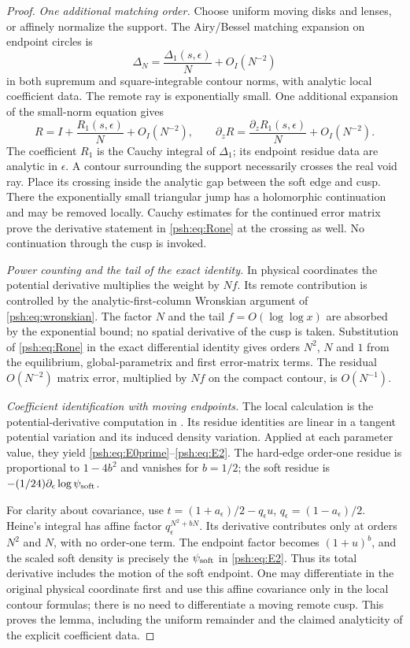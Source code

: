 \documentclass[11pt,a4paper]{article}
\numberwithin{equation}{section}
\theoremstyle{remark}\newtheorem{remark}[theorem]{Remark}
\begin{document}
\begin{proof}
\textit{One additional matching order.}
Choose uniform moving disks and lenses, or affinely normalize the
support. The Airy/Bessel matching expansion on endpoint circles is
\[
 \Delta_N=\frac{\Delta_1(s,\epsilon)}N+O_I(N^{-2})
\]
in both supremum and square-integrable contour norms, with analytic
local coefficient data. The remote ray is exponentially small.
One additional expansion of the small-norm equation gives
\begin{equation}\label{psh:eq:Rone}
 R=I+\frac{R_1(s,\epsilon)}N+O_I(N^{-2}),\qquad
 \partial_zR=\frac{\partial_zR_1(s,\epsilon)}N+O_I(N^{-2}).
\end{equation}
The coefficient $R_1$ is the Cauchy integral of $\Delta_1$; its endpoint
residue data are analytic in $\epsilon$.
A contour surrounding the support necessarily crosses the real void
ray. Place its crossing inside the analytic gap between the soft edge
and cusp. There the exponentially small triangular jump has a
holomorphic continuation and may be removed locally. Cauchy estimates
for the continued error matrix prove the derivative statement in
\eqref{psh:eq:Rone} at the crossing as well. No continuation through the
cusp is invoked.

\textit{Power counting and the tail of the exact identity.}
In physical coordinates the potential derivative multiplies the weight
by $Nf$. Its remote contribution is controlled by the analytic-first-column
Wronskian argument of \eqref{psh:eq:wronskian}. The factor $N$ and the tail
$f=O(\log\log x)$ are absorbed by the exponential bound; no spatial
derivative of the cusp is taken. Substitution of \eqref{psh:eq:Rone} in the
exact differential identity gives orders $N^2$, $N$ and $1$ from the
equilibrium, global-parametrix and first error-matrix terms. The residual
$O(N^{-2})$ matrix error, multiplied by $Nf$ on the compact contour,
is $O(N^{-1})$.

\textit{Coefficient identification with moving endpoints.}
The local calculation is the potential-derivative computation in
\cite[Section 8, especially (8.28), (8.39), (8.43)--(8.44)]{psh-cg}.
Its residue identities are linear in a tangent potential variation and
its induced density variation. Applied at each parameter value, they
yield \eqref{psh:eq:E0prime}--\eqref{psh:eq:E2}.
The hard-edge order-one residue is proportional to $1-4b^2$ and
vanishes for $b=1/2$; the soft residue is
$-(1/24)\partial_\epsilon\log\psi_{\rm soft}$.

For clarity about covariance, use
$t=(1+a_\epsilon)/2-q_\epsilon u$,
$q_\epsilon=(1-a_\epsilon)/2$.
Heine's integral has affine factor $q_\epsilon^{N^2+bN}$.
Its derivative contributes only at orders $N^2$ and $N$, with no
order-one term. The endpoint factor becomes $(1+u)^b$, and the scaled
soft density is precisely the $\psi_{\rm soft}$ in \eqref{psh:eq:E2}.
Thus its total derivative includes the motion of the soft endpoint.
One may differentiate in the original physical coordinate first and
use this affine covariance only in the local contour formulas; there
is no need to differentiate a moving remote cusp. This proves the
lemma, including the uniform remainder and the claimed analyticity of
the explicit coefficient data.
\end{proof}
\end{document}
